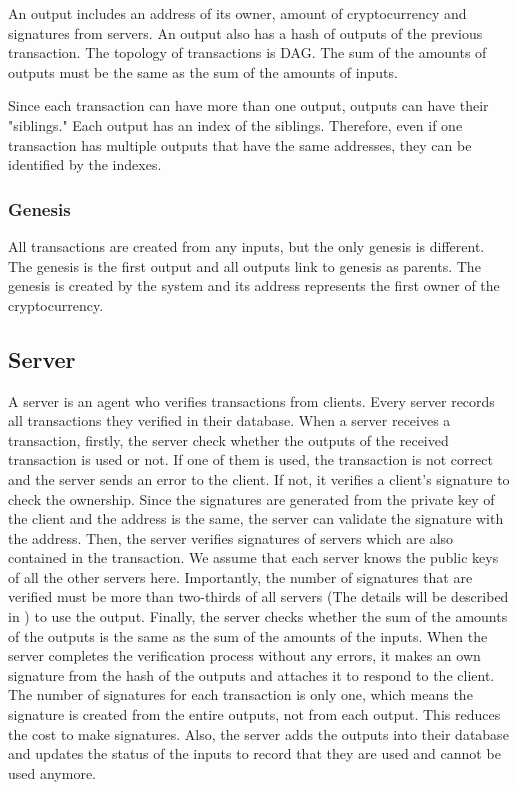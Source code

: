 \documentclass[a4paper, oneside]{discothesis}
\begin{document}
An output includes an address of its owner, amount of cryptocurrency
and signatures from servers.
An output also has a hash of outputs of the previous transaction.
The topology of transactions is DAG.
The sum of the amounts of outputs must be the same as the sum of the amounts of inputs.

Since each transaction can have more than one output, outputs can have their "siblings."
Each output has an index of the siblings.
Therefore, even if one transaction has multiple outputs that have the same addresses,
they can be identified by the indexes.



\subsubsection{Genesis}
All transactions are created from any inputs, but the only genesis is different.
The genesis is the first output and all outputs link to genesis as parents.
The genesis is created by the system and its address represents the first owner
of the cryptocurrency.

\subsection{Server}
A server is an agent who verifies transactions from clients.
Every server records all transactions they verified in their database.
When a server receives a transaction, firstly, the server check
whether the outputs of the received transaction is used or not.
If one of them is used, the transaction is not correct
and the server sends an error to the client.
If not, it verifies a client's signature to check the ownership.
Since the signatures are generated from the private key of the client
and the address is the same, the server can validate the signature with the address.
Then, the server verifies signatures of servers which are also contained in the transaction.
We assume that each server knows the public keys of all the other servers here.
Importantly, the number of signatures that are verified must be more than two-thirds
of all servers (The details will be described in ) %
to use the output.
Finally, the server checks whether the sum of the amounts of the outputs is the same as
the sum of the amounts of the inputs.
When the server completes the verification process without any errors,
it makes an own signature from the hash of the outputs and attaches it to respond to the client.
The number of signatures for each transaction is only one, which means the signature is created
from the entire outputs, not from each output.
This reduces the cost to make signatures.
Also, the server adds the outputs into their database and updates the status of the inputs
to record that they are used and cannot be used anymore.
\end{document}
